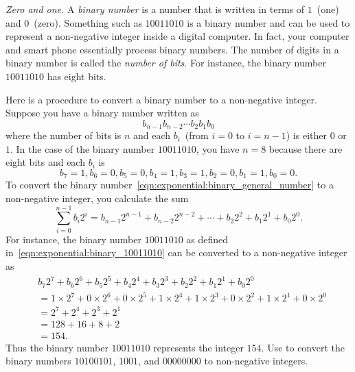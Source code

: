 \documentclass[a4paper,oneside,12pt]{article}
\begin{document}
\begin{problem}
\item\emph{Zero and one.}
  A \emph{binary number} is a number that is written in terms of
  $1$~(one) and $0$~(zero).  Something such as $10011010$ is a binary
  number and can be used to represent a non-negative integer inside a
  digital computer.  In fact, your computer and smart phone
  essentially process binary numbers.  The number of digits in a
  binary number is called the \emph{number of bits}.  For instance,
  the binary number $10011010$ has eight bits.
  \begin{packedenum}
  \item\label{subprob:exponential:binary_to_decimal}
    Here is a procedure to convert a binary number to a non-negative
    integer.  Suppose you have a binary number written as
    \begin{equation}
    \label{eqn:exponential:binary_general_number}
    b_{n-1} b_{n-2} \cdots b_2 b_1 b_0
    \end{equation}
    where the number of bits is $n$ and each $b_i$~(from $i = 0$ to
    $i = n - 1$) is either $0$ or $1$.  In the case of the binary
    number $10011010$, you have $n = 8$ because there are eight bits
    and each $b_i$ is
    \begin{equation}
    \label{eqn:exponential:binary_10011010}
    b_7 = 1\comma
    b_6 = 0\comma
    b_5 = 0\comma
    b_4 = 1\comma
    b_3 = 1\comma
    b_2 = 0\comma
    b_1 = 1\comma
    b_0 = 0.
    \end{equation}
    To convert the binary
    number~\eqref{eqn:exponential:binary_general_number} to a
    non-negative integer, you calculate the sum
    \begin{equation}
    \label{eqn:exponential:binary_to_decimal_formula}
    \sum_{i=0}^{n-1} b_i 2^i
    =
    b_{n-1} 2^{n-1} + b_{n-2} 2^{n-2} + \cdots
    + b_2 2^2 + b_1 2^1 + b_0 2^0.
    \end{equation}
    For instance, the binary number $10011010$ as defined
    in~\eqref{eqn:exponential:binary_10011010} can be converted to a
    non-negative integer as
    \begin{align*}
    &b_7 2^7 + b_6 2^6 + b_5 2^5 + b_4 2^4
      + b_3 2^3 + b_2 2^2 + b_1 2^1 + b_0 2^0 \\[4pt]
    &=
    1 \times 2^7 + 0 \times 2^6 + 0 \times 2^5 + 1 \times 2^4
    + 1 \times 2^3 + 0 \times 2^2 + 1 \times 2^1 + 0 \times 2^0 \\[4pt]
    &=
    2^7 + 2^4 + 2^3 + 2^1 \\[4pt]
    &=
    128 + 16 + 8 + 2 \\[4pt]
    &=
    154.
    \end{align*}
    Thus the binary number $10011010$ represents the integer $154$.
    Use  to
    convert the binary numbers $10100101$, $1001$, and $00000000$ to
    non-negative integers.


\end{packedenum}
\end{problem}
\end{document}
